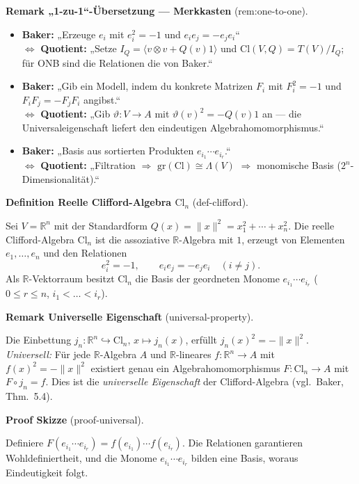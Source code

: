 \documentclass[10pt, letterpaper]{article}
\newcommand{\R}{\mathbb{R}}
\newcommand{\Cl}{\mathrm{Cl}}
\newcommand{\CustomHeading}[3]{%
  \par\medskip\noindent%
  \textbf{#1 #2} \textnormal{(#3)}.\enskip%
}
\newenvironment{DEF}[2]{\begin{unitbox}\CustomHeading{Definition}{#1}{#2}}{\end{unitbox}}
\newenvironment{REM}[2]{\begin{unitbox}\CustomHeading{Remark}{#1}{#2}}{\end{unitbox}}
\newenvironment{PROOF}[2]{\begin{unitbox}\CustomHeading{Proof}{#1}{#2}}{\end{unitbox}}
\begin{document}
\begin{REM}{„1-zu-1“-Übersetzung — Merkkasten}{rem:one-to-one}
\begin{itemize}[leftmargin=*]
\item \textbf{Baker:} „Erzeuge $e_i$ mit $e_i^2=-1$ und $e_ie_j=-e_je_i$“\\
\(\Longleftrightarrow\) \textbf{Quotient:} „Setze $I_Q=\langle v\otimes v+Q(v)1\rangle$ und
$\Cl(V,Q)=T(V)/I_Q$; für ONB sind die Relationen die von Baker.“
\item \textbf{Baker:} „Gib ein Modell, indem du konkrete Matrizen $F_i$ mit $F_i^2=-1$ und $F_iF_j=-F_jF_i$ angibst.“\\
\(\Longleftrightarrow\) \textbf{Quotient:} „Gib $\vartheta:V\to A$ mit $\vartheta(v)^2=-Q(v)1$ an —
die Universaleigenschaft liefert den eindeutigen Algebrahomomorphismus.“
\item \textbf{Baker:} „Basis aus sortierten Produkten $e_{i_1}\cdots e_{i_r}$.“\\
\(\Longleftrightarrow\) \textbf{Quotient:} „Filtration $\Rightarrow$ $\mathrm{gr}(\Cl)\cong\Lambda(V)$
$\Rightarrow$ monomische Basis ($2^n$-Dimensionalität).“
\end{itemize}
\end{REM}



\begin{DEF}{Reelle Clifford-Algebra $\Cl_n$}{def-clifford}
Sei $V=\R^n$ mit der Standardform $Q(x)=\|x\|^2=x_1^2+\cdots+x_n^2$.
Die reelle Clifford-Algebra $\Cl_n$ ist die assoziative $\R$-Algebra
mit $1$, erzeugt von Elementen $e_1,\dots,e_n$ und den Relationen
\[
e_i^2=-1,\qquad e_ie_j=-e_je_i\quad(i\neq j).
\]
Als $\R$-Vektorraum besitzt $\Cl_n$ die Basis der geordneten Monome
$e_{i_1}\cdots e_{i_r}$ ($0\le r\le n$, $i_1<\dots<i_r$).
\end{DEF}

\begin{REM}{Universelle Eigenschaft}{universal-property}
Die Einbettung $j_n:\R^n\hookrightarrow \Cl_n$, $x\mapsto j_n(x)$,
erfüllt $j_n(x)^2=-\|x\|^2$.
\emph{Universell:} Für jede $\R$-Algebra $A$ und $\R$-lineares
$f:\R^n\to A$ mit $f(x)^2=-\|x\|^2$ existiert genau ein
Algebrahomomorphismus $F:\Cl_n\to A$ mit $F\circ j_n=f$.
Dies ist die \emph{universelle Eigenschaft} der Clifford-Algebra
(vgl.\ Baker, Thm.~5.4).
\end{REM}

\begin{PROOF}{Skizze}{proof-universal}
Definiere $F(e_{i_1}\cdots e_{i_r})=f(e_{i_1})\cdots f(e_{i_r})$.
Die Relationen garantieren Wohldefiniertheit,
und die Monome $e_{i_1}\cdots e_{i_r}$ bilden eine Basis,
woraus Eindeutigkeit folgt.
\end{PROOF}
\end{document}
